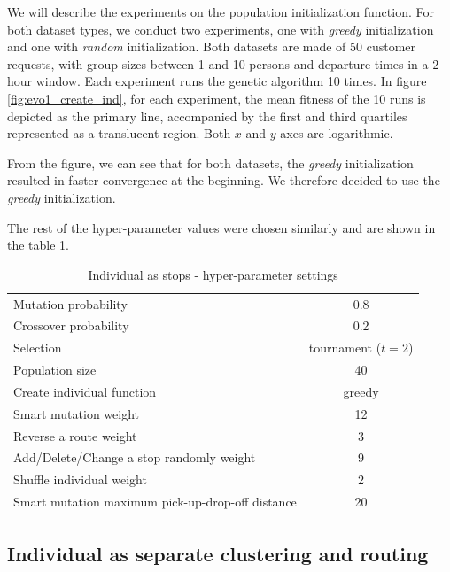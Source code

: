 \label{experiment_graph_description}
We will describe the experiments on the population initialization function. For both dataset types, we conduct two experiments, one with \textit{greedy} initialization and one with \textit{random} initialization. Both datasets are made of 50 customer requests, with group sizes between 1 and 10 persons and departure times in a 2-hour window. Each experiment runs the genetic algorithm 10 times. In figure \ref{fig:evo1_create_ind}, for each experiment, the mean fitness of the 10 runs is depicted as the primary line, accompanied by the first and third quartiles represented as a translucent region. Both $x$ and $y$ axes are logarithmic.

From the figure, we can see that for both datasets, the \textit{greedy} initialization resulted in faster convergence at the beginning. We therefore decided to use the \textit{greedy} initialization.

The rest of the hyper-parameter values were chosen similarly and are shown in the table \ref{tab:evo_stops_hyperparams}.

\begin{table}[ht]
    \centering
    \begin{tabular}{lc}
        Mutation probability & 0.8 \\
        Crossover probability & 0.2 \\
        Selection & tournament ($t=2$) \\
        Population size & 40 \\
        Create individual function & greedy \\
        Smart mutation weight & 12 \\
        Reverse a route weight & 3 \\
        Add/Delete/Change a stop randomly weight & 9 \\
        Shuffle individual weight & 2 \\
        Smart mutation maximum pick-up-drop-off distance & 20 \\
    \end{tabular}
    \caption{Individual as stops - hyper-parameter settings}
    \label{tab:evo_stops_hyperparams}
\end{table}

\subsection{Individual as separate clustering and routing}

